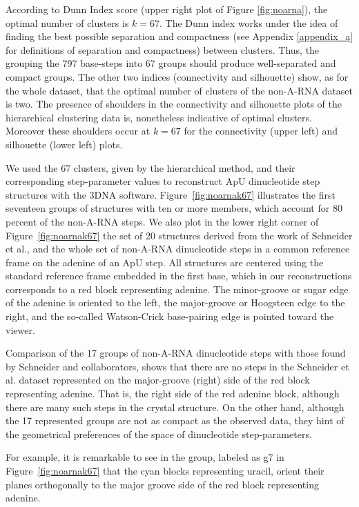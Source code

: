 According   to  Dunn  Index   score  (upper   right  plot   of  Figure
\ref{fig:noarna}), the optimal number  of clusters is $k=67$. The Dunn
index works under the idea of finding the best possible separation and
compactness   (see  Appendix   \ref{appendix_a}  for   definitions  of
separation and  compactness) between  clusters. Thus, the  grouping the
797  base-steps  into  67  groups should  produce  well-separated  and
compact groups.   The other two indices  (connectivity and silhouette)
show, as for the whole dataset, that the optimal number of clusters of
the  non-A-RNA dataset  is  two.   The presence  of  shoulders in  the
connectivity and silhouette plots  of the hierarchical clustering data
is,  nonetheless  indicative   of  optimal  clusters.  Moreover  these
shoulders  occur  at $k=67$  for  the  connectivity  (upper left)  and
silhouette (lower left) plots.

We used the  67 clusters, given by the  hierarchical method, and their
corresponding  step-parameter values  to reconstruct  ApU dinucleotide
step  structures with  the 3DNA  software.  Figure~\ref{fig:noarnak67}
illustrates the first seventeen groups  of structures with ten or more
members, which account for 80 percent of the non-A-RNA steps.  We also
plot in  the lower right corner of  Figure~\ref{fig:noarnak67} the set
of   20   structures  derived   from   the   work   of  Schneider   et
al.\cite{schneider2004}, and  the whole set  of non-A-RNA dinucleotide
steps in a common reference frame  on the adenine of an ApU step.  All
structures are centered using the standard reference frame embedded in
the  first base,  which in  our reconstructions  corresponds to  a red
block  representing adenine.  The minor-groove  or sugar  edge  of the
adenine is oriented to the left, the major-groove or Hoogsteen edge to
the right, and the so-called Watson-Crick base-pairing edge is pointed
toward the viewer.

Comparison of the 17 groups of non-A-RNA dinucleotide steps with those
found by Schneider and collaborators, shows that there are no steps in
the Schneider  et al. dataset represented on  the major-groove (right)
side of the red block representing adenine. That is, the right side of
the  red adenine  block, although  there are  many such  steps  in the
crystal  structure. On  the other  hand, although  the  17 represented
groups  are not  as compact  as the  observed data,  they hint  of the
geometrical preferences of the space of dinucleotide step-parameters.

For example, it  is remarkable to see in the  group, labeled as g7
in  Figure~\ref{fig:noarnak67}  that   the  cyan  blocks  representing
uracil, orient their  planes orthogonally to the major  groove side of
the red block representing adenine.

